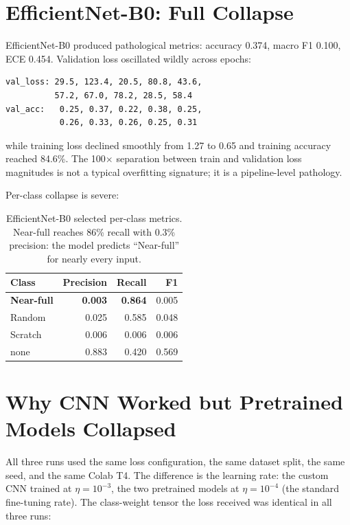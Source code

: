 \documentclass[conference]{IEEEtran}
\begin{document}
\section{EfficientNet-B0: Full Collapse}

EfficientNet-B0 produced pathological metrics: accuracy 0.374, macro F1
0.100, ECE 0.454. Validation loss oscillated wildly across epochs:

\begin{lstlisting}
val_loss: 29.5, 123.4, 20.5, 80.8, 43.6,
          57.2, 67.0, 78.2, 28.5, 58.4
val_acc:   0.25, 0.37, 0.22, 0.38, 0.25,
           0.26, 0.33, 0.26, 0.25, 0.31
\end{lstlisting}

while training loss declined smoothly from 1.27 to 0.65 and training
accuracy reached 84.6\%. The 100$\times$ separation between train and
validation loss magnitudes is not a typical overfitting signature; it is
a pipeline-level pathology.

Per-class collapse is severe:

\begin{table}[H]
\centering
\begin{tabular}{lrrr}
\toprule
Class & Precision & Recall & F1 \\
\midrule
\textbf{Near-full} & \textbf{0.003} & \textbf{0.864} & 0.005 \\
Random             & 0.025 & 0.585 & 0.048 \\
Scratch            & 0.006 & 0.006 & 0.006 \\
none               & 0.883 & 0.420 & 0.569 \\
\bottomrule
\end{tabular}
\caption{EfficientNet-B0 selected per-class metrics. Near-full reaches
86\% recall with 0.3\% precision: the model predicts ``Near-full'' for
nearly every input.}
\end{table}

\section{Why CNN Worked but Pretrained Models Collapsed}

All three runs used the same loss configuration, the same dataset split,
the same seed, and the same Colab T4. The difference is the learning rate:
the custom CNN trained at $\eta = 10^{-3}$, the two pretrained models at
$\eta = 10^{-4}$ (the standard fine-tuning rate). The class-weight tensor
the loss received was identical in all three runs:
\end{document}
